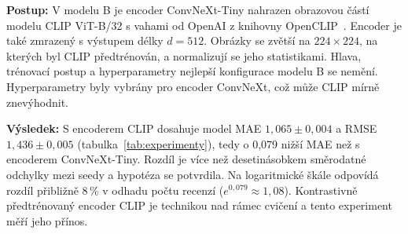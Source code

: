 \textbf{Postup:} V modelu B je encoder ConvNeXt-Tiny nahrazen obrazovou částí modelu CLIP
ViT-B/32 s vahami od OpenAI z knihovny OpenCLIP~\cite{ilharco2021openclip}. Encoder je také
zmrazený s výstupem délky $d = 512$. Obrázky se zvětší na $224 \times 224$, na kterých byl
CLIP předtrénován, a normalizují se jeho statistikami. Hlava, trénovací postup a hyperparametry
nejlepší konfigurace modelu B se nemění. Hyperparametry byly vybrány pro encoder ConvNeXt, což může CLIP mírně znevýhodnit.

\textbf{Výsledek:} S encoderem CLIP dosahuje model MAE $1{,}065 \pm 0{,}004$ a RMSE
$1{,}436 \pm 0{,}005$ (tabulka~\ref{tab:experimenty}), tedy o 0,079 nižší MAE než s encoderem
ConvNeXt-Tiny. Rozdíl je více než desetinásobkem směrodatné odchylky mezi seedy a hypotéza
se potvrdila. Na logaritmické škále odpovídá rozdíl přibližně 8\,\% v odhadu počtu recenzí
($e^{0{,}079} \approx 1{,}08$). Kontrastivně předtrénovaný encoder CLIP je technikou nad rámec
cvičení a tento experiment měří jeho přínos.
